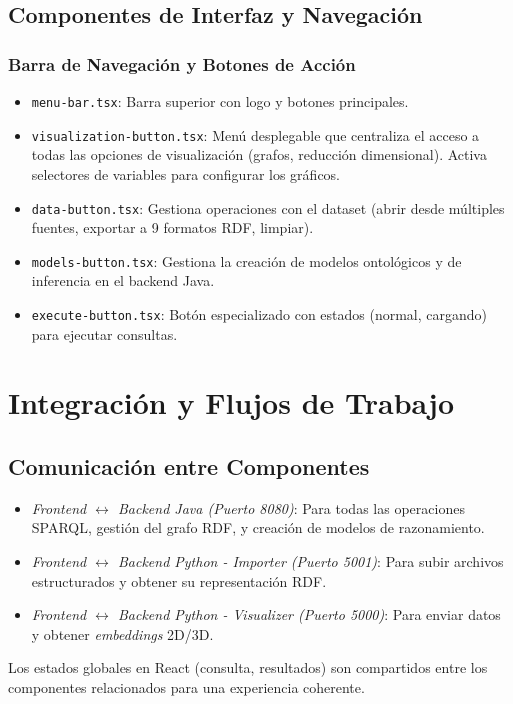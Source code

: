 \documentclass{article}
\begin{document}
\subsection{Componentes de Interfaz y Navegación}

\subsubsection{Barra de Navegación y Botones de Acción}
\begin{itemize}
    \item \texttt{menu-bar.tsx}: Barra superior con logo y botones principales.
    \item \texttt{visualization-button.tsx}: Menú desplegable que centraliza el acceso a todas las opciones de visualización (grafos, reducción dimensional). Activa selectores de variables para configurar los gráficos.
    \item \texttt{data-button.tsx}: Gestiona operaciones con el dataset (abrir desde múltiples fuentes, exportar a 9 formatos RDF, limpiar).
    \item \texttt{models-button.tsx}: Gestiona la creación de modelos ontológicos y de inferencia en el backend Java.
    \item \texttt{execute-button.tsx}: Botón especializado con estados (normal, cargando) para ejecutar consultas.
\end{itemize}

\section{Integración y Flujos de Trabajo}
\subsection{Comunicación entre Componentes}
\begin{itemize}
    \item \textit{Frontend $\leftrightarrow$ Backend Java (Puerto 8080)}: Para todas las operaciones SPARQL, gestión del grafo RDF, y creación de modelos de razonamiento.
    \item \textit{Frontend $\leftrightarrow$ Backend Python - Importer (Puerto 5001)}: Para subir archivos estructurados y obtener su representación RDF.
    \item \textit{Frontend $\leftrightarrow$ Backend Python - Visualizer (Puerto 5000)}: Para enviar datos y obtener \textit{embeddings} 2D/3D.
\end{itemize}
Los estados globales en React (consulta, resultados) son compartidos entre los componentes relacionados para una experiencia coherente.
\end{document}
